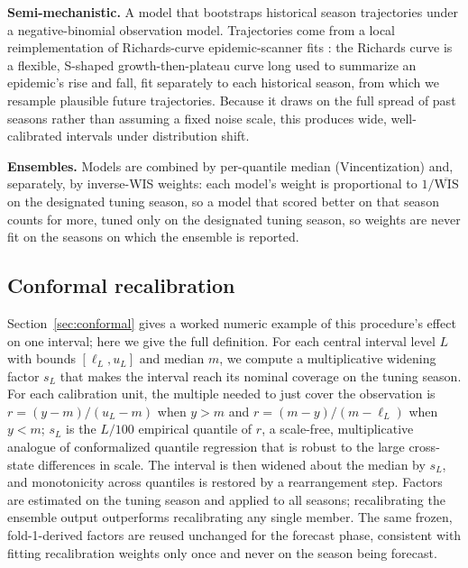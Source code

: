 \documentclass[11pt]{article}
\begin{document}
\noindent\textbf{Semi-mechanistic.} A model that bootstraps historical season trajectories under a
negative-binomial observation model. Trajectories come from a local reimplementation of
Richards-curve epidemic-scanner fits \citep{richards1959}: the Richards curve is a flexible,
S-shaped growth-then-plateau curve long used to summarize an epidemic's rise and fall, fit
separately to each historical season, from which we resample plausible future trajectories. Because
it draws on the full spread of past seasons rather than assuming a fixed noise scale, this
produces wide, well-calibrated intervals under distribution shift.

\noindent\textbf{Ensembles.} Models are combined by per-quantile median (Vincentization) and,
separately, by inverse-WIS weights: each model's weight is proportional to $1/\overline{\mathrm{WIS}}$
on the designated tuning season, so a model that scored better on that season counts for more,
tuned only on the designated tuning season, so weights are never fit on the
seasons on which the ensemble is reported.

\subsection{Conformal recalibration}\label{sec:methods-conformal}
Section~\ref{sec:conformal} gives a worked numeric example of this procedure's effect on one
interval; here we give the full definition. For each central interval level $L$ with bounds
$[\ell_L,u_L]$ and median $m$, we compute a
multiplicative widening factor $s_L$ that makes the interval reach its nominal coverage on the tuning
season. For each calibration unit, the multiple needed to just cover the observation is
$r=(y-m)/(u_L-m)$ when $y>m$ and $r=(m-y)/(m-\ell_L)$ when $y<m$; $s_L$ is the $L/100$ empirical
quantile of $r$, a scale-free, multiplicative analogue of conformalized quantile regression that is
robust to the large cross-state differences in scale. The interval is then widened about the median
by $s_L$, and monotonicity across quantiles is restored by a rearrangement step. Factors are estimated
on the tuning season and applied to all seasons; recalibrating the ensemble output outperforms
recalibrating any single member. The same frozen, fold-1-derived factors are reused unchanged for the
forecast phase, consistent with fitting recalibration weights only once and never on the season being
forecast.
\end{document}
